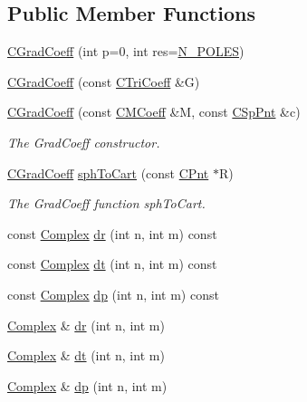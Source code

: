 \subsection*{Public Member Functions}
\begin{DoxyCompactItemize}
\item 
\hyperlink{classCGradCoeff_a7c595720bc6386dbe58e7a02a145ed74}{C\-Grad\-Coeff} (int p=0, int res=\hyperlink{mcoeff_8h_ac23f9c13c5d07d9ce386f7a830c35e5a}{N\-\_\-\-P\-O\-L\-E\-S})
\item 
\hyperlink{classCGradCoeff_a08b900b0d57467172733978a44c076f8}{C\-Grad\-Coeff} (const \hyperlink{classCTriCoeff}{C\-Tri\-Coeff} \&G)
\item 
\hyperlink{classCGradCoeff_a41d80b3998f3dfe2a9111ab9f00855fb}{C\-Grad\-Coeff} (const \hyperlink{classCMCoeff}{C\-M\-Coeff} \&M, const \hyperlink{classCSpPnt}{C\-Sp\-Pnt} \&c)
\begin{DoxyCompactList}\small\item\em The Grad\-Coeff constructor. \end{DoxyCompactList}\item 
\hyperlink{classCGradCoeff}{C\-Grad\-Coeff} \hyperlink{classCGradCoeff_ae5711114b36c80f3547ec0857e476500}{sph\-To\-Cart} (const \hyperlink{classCPnt}{C\-Pnt} $\ast$R)
\begin{DoxyCompactList}\small\item\em The Grad\-Coeff function sph\-To\-Cart. \end{DoxyCompactList}\item 
const \hyperlink{util_8h_a0ef19d29521fc1e3356ea268ba175cfc}{Complex} \hyperlink{classCGradCoeff_ada19e3bbd4f70e5115535cc4365f51b3}{dr} (int n, int m) const 
\item 
const \hyperlink{util_8h_a0ef19d29521fc1e3356ea268ba175cfc}{Complex} \hyperlink{classCGradCoeff_ace80d29d482ccc81d023c2a035dd6022}{dt} (int n, int m) const 
\item 
const \hyperlink{util_8h_a0ef19d29521fc1e3356ea268ba175cfc}{Complex} \hyperlink{classCGradCoeff_a85b5a919cd317987dcb62c7828d179f5}{dp} (int n, int m) const 
\item 
\hyperlink{util_8h_a0ef19d29521fc1e3356ea268ba175cfc}{Complex} \& \hyperlink{classCGradCoeff_acb9edf25321b20753b1e44f1f1a34a04}{dr} (int n, int m)
\item 
\hyperlink{util_8h_a0ef19d29521fc1e3356ea268ba175cfc}{Complex} \& \hyperlink{classCGradCoeff_a7f6f243c58b4de0be441447b4cc1e7e7}{dt} (int n, int m)
\item 
\hyperlink{util_8h_a0ef19d29521fc1e3356ea268ba175cfc}{Complex} \& \hyperlink{classCGradCoeff_afb5b5790c9ddcfbc2b3f88227ca3b74f}{dp} (int n, int m)
\end{DoxyCompactItemize}
